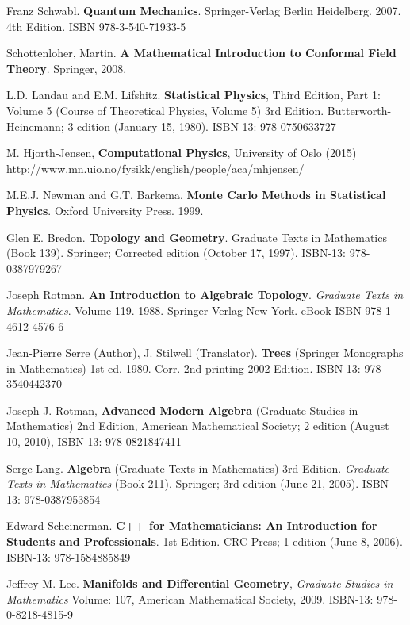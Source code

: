 \documentclass[10pt]{amsart}
\begin{document}
\begin{thebibliography}{9}
Franz Schwabl. \textbf{Quantum Mechanics}. Springer-Verlag Berlin Heidelberg. 2007. 4th Edition. ISBN 978-3-540-71933-5

Schottenloher, Martin.  \textbf{A Mathematical Introduction to Conformal Field Theory}.  Springer, 2008.  

L.D. Landau and E.M. Lifshitz.  \textbf{Statistical Physics}, Third Edition, Part 1: Volume 5 (Course of Theoretical Physics, Volume 5) 3rd Edition.  Butterworth-Heinemann; 3 edition (January 15, 1980).  ISBN-13: 978-0750633727

M. Hjorth-Jensen, \textbf{Computational Physics}, University of Oslo (2015) \url{http://www.mn.uio.no/fysikk/english/people/aca/mhjensen/}



M.E.J. Newman and G.T. Barkema.  \textbf{Monte Carlo Methods in Statistical Physics}.  Oxford University Press.  1999.  


Glen E. Bredon.  \textbf{Topology and Geometry}. Graduate Texts in Mathematics (Book 139).  Springer; Corrected edition (October 17, 1997).  ISBN-13: 978-0387979267

Joseph Rotman. \textbf{An Introduction to Algebraic Topology}. \emph{Graduate Texts in Mathematics}. Volume 119. 1988. Springer-Verlag New York. eBook ISBN
978-1-4612-4576-6

Jean-Pierre Serre (Author), J. Stilwell (Translator).  \textbf{Trees} (Springer Monographs in Mathematics) 1st ed. 1980. Corr. 2nd printing 2002 Edition.  ISBN-13: 978-3540442370

Joseph J. Rotman, \textbf{Advanced Modern Algebra} (Graduate Studies in Mathematics) 2nd Edition, American Mathematical Society; 2 edition (August 10, 2010), ISBN-13: 978-0821847411

Serge Lang. \textbf{Algebra} (Graduate Texts in Mathematics) 3rd Edition. \emph{Graduate Texts in Mathematics} (Book 211). Springer; 3rd edition (June 21, 2005). ISBN-13: 978-0387953854

Edward Scheinerman.  \textbf{C++ for Mathematicians: An Introduction for Students and Professionals}. 1st Edition.  CRC Press; 1 edition (June 8, 2006).  ISBN-13: 978-1584885849 


Jeffrey M. Lee. \textbf{Manifolds and Differential Geometry}, \emph{Graduate Studies in Mathematics} Volume: 107, American Mathematical Society, 2009. ISBN-13: 978-0-8218-4815-9


\end{thebibliography}
\end{document}
